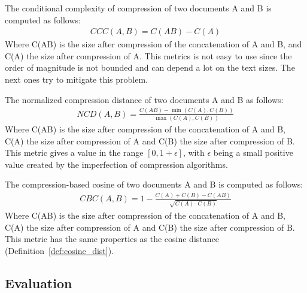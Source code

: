 \begin{definition}
  The conditional complexity of compression of two documents A and B is computed as follows:
  \begin{gather*}
    CCC(A, B) = C(AB) - C(A)
  \end{gather*}
  Where C(AB) is the size after compression of the concatenation of A and B, and C(A) the size after compression of A.
  This metrics is not easy to use since the order of magnitude is not bounded and can depend a lot on the text sizes.
  The next ones try to mitigate this problem.
\end{definition}

\begin{definition}
  The normalized compression distance of two documents A and B as follows:
  \begin{gather*}
    NCD(A, B) = \frac{C(AB) - \min(C(A), C(B))}{\max(C(A), C(B))}
  \end{gather*}
  Where C(AB) is the size after compression of the concatenation of A and B, C(A) the size after compression of A and C(B) the size after compression of B.
  This metric gives a value in the range $\left[0, 1+\epsilon\right]$, with $\epsilon$ being a small positive value created by the imperfection of compression algorithms.
\end{definition}

\begin{definition}
  The compression-based cosine of two documents A and B is computed as follows:
  \begin{gather*}
    CBC(A, B) = 1 - \frac{C(A) + C(B) - C(AB)}{\sqrt{C(A) \cdot C(B)}}
  \end{gather*}
  Where C(AB) is the size after compression of the concatenation of A and B, C(A) the size after compression of A and C(B) the size after compression of B.
  This metric has the same properties as the cosine distance (Definition~\ref{def:cosine_dist}).
\end{definition}

\subsection{Evaluation}

